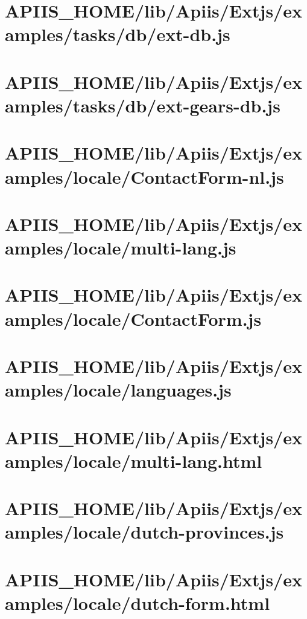 \section{APIIS\_HOME/lib/Apiis/Extjs/examples/tasks/db/ext-db.js} 
\section{APIIS\_HOME/lib/Apiis/Extjs/examples/tasks/db/ext-gears-db.js} 
\section{APIIS\_HOME/lib/Apiis/Extjs/examples/locale/ContactForm-nl.js} 
\section{APIIS\_HOME/lib/Apiis/Extjs/examples/locale/multi-lang.js} 
\section{APIIS\_HOME/lib/Apiis/Extjs/examples/locale/ContactForm.js} 
\section{APIIS\_HOME/lib/Apiis/Extjs/examples/locale/languages.js} 
\section{APIIS\_HOME/lib/Apiis/Extjs/examples/locale/multi-lang.html} 
\section{APIIS\_HOME/lib/Apiis/Extjs/examples/locale/dutch-provinces.js} 
\section{APIIS\_HOME/lib/Apiis/Extjs/examples/locale/dutch-form.html} 
